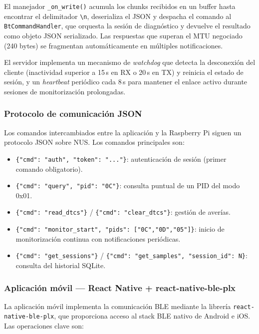 El manejador \texttt{\_on\_write()} acumula los chunks recibidos en un buffer hasta encontrar el delimitador \texttt{\textbackslash n}, deserializa el JSON y despacha el comando al \texttt{BtCommandHandler}, que orquesta la sesión de diagnóstico y devuelve el resultado como objeto JSON serializado. Las respuestas que superan el MTU negociado (240 bytes) se fragmentan automáticamente en múltiples notificaciones.

El servidor implementa un mecanismo de \textit{watchdog} que detecta la desconexión del cliente (inactividad superior a 15\,s en RX o 20\,s en TX) y reinicia el estado de sesión, y un \textit{heartbeat} periódico cada 8\,s para mantener el enlace activo durante sesiones de monitorización prolongadas.

\subsubsection*{Protocolo de comunicación JSON}

Los comandos intercambiados entre la aplicación y la Raspberry Pi siguen un protocolo JSON sobre NUS. Los comandos principales son:

\begin{itemize}
    \item \verb|{"cmd": "auth", "token": "..."}|: autenticación de sesión (primer comando obligatorio).
    \item \verb|{"cmd": "query", "pid": "0C"}|: consulta puntual de un PID del modo 0x01.
    \item \verb|{"cmd": "read_dtcs"}| / \verb|{"cmd": "clear_dtcs"}|: gestión de averías.
    \item \verb|{"cmd": "monitor_start", "pids": ["0C","0D","05"]}|: inicio de monitorización continua con notificaciones periódicas.
    \item \verb|{"cmd": "get_sessions"}| / \verb|{"cmd": "get_samples", "session_id": N}|: consulta del historial SQLite.
\end{itemize}

\subsubsection*{Aplicación móvil — React Native + react-native-ble-plx}

La aplicación móvil implementa la comunicación BLE mediante la librería \texttt{react-native-ble-plx}, que proporciona acceso al stack BLE nativo de Android e iOS. Las operaciones clave son:

